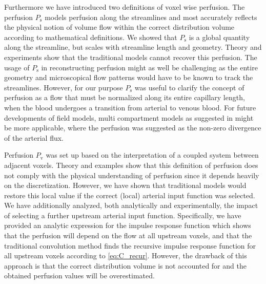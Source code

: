 \documentclass[journal,twocolumn]{IEEEtran}
\newcommand{\Perfv}{P_{\mathrm{v}}}
\newcommand{\Perfs}{P_{\mathrm{s}}}
\begin{document}
	Furthermore we have introduced two definitions of voxel wise perfusion.
	The perfusion $\Perfs$ models perfusion along the streamlines and most accurately reflects the physical notion of volume flow within the correct distribution volume according to mathematical definitions. We showed that $\Perfs$ is a global quantity along the streamline, but scales with streamline length and geometry.
	Theory and experiments show that the traditional models cannot recover this perfusion. The usage of $\Perfs$ in reconstructing perfusion might as well be challenging as the entire geometry and microscopical flow patterns would have to be known to track the streamlines. However, for our purpose $\Perfs$ was useful to clarify the concept of perfusion as a flow that must be normalized along its entire capillary length, when the blood undergoes a transition from arterial to venous blood. 
	For future developments of field models, multi compartment models as suggested in \cite{sourbron14} might be more applicable, where the perfusion was suggested as the non-zero divergence of the arterial flux.
	
	Perfusion $\Perfv$ was set up based on the interpretation of a coupled system between adjacent voxels. 
	Theory and examples show that this definition of perfusion does not comply with the physical understanding of perfusion since it depends heavily on the discretization.
	However, we have shown that traditional models would restore this local value if the correct (local) arterial input function was selected.
	We have additionally analyzed, both analytically and experimentally, the impact of selecting a further upstream arterial input function.
	Specifically, we have provided an analytic expression for the impulse response function which shows that the perfusion will depend on the flow at all upstream voxels, and that the traditional convolution method finds the recursive impulse response function for all upstream voxels according to \eqref{eq:C_recur}. However, the drawback of this approach is that the correct distribution volume is not accounted for and the obtained perfusion values will be overestimated.
	
\end{document}
